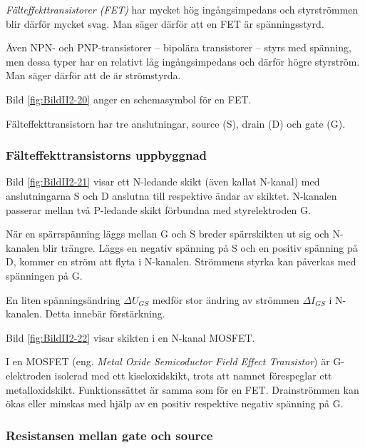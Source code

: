 \emph{Fälteffekttransistorer (FET)} har mycket hög ingångsimpedans och
styrströmmen blir därför mycket svag.
Man säger därför att en FET är spänningsstyrd.

Även NPN- och PNP-transistorer -- bipolära transistorer -- styrs med spänning,
men dessa typer har en relativt låg ingångsimpedans och därför högre styrström.
Man säger därför att de är strömstyrda.


Bild \ref{fig:BildII2-20} anger en schemasymbol för en FET.

Fälteffekttransistorn har tre anslutningar, source (S), drain (D) och gate (G).


\subsubsection{Fälteffekttransistorns uppbyggnad}

Bild \ref{fig:BildII2-21} visar ett N-ledande skikt (även kallat N-kanal) med
anslutningarna S och D anslutna till respektive ändar av skiktet.
N-kanalen passerar mellan två P-ledande skikt förbundna med styrelektroden G.

När en spärrspänning läggs mellan G och S breder spärrskikten ut sig och N-kanalen blir trängre.
Läggs en negativ spänning på S och en positiv spänning på D, kommer en ström att flyta i N-kanalen.
Strömmens styrka kan påverkas med spänningen på G.

En liten spänningsändring \(\Delta U_{GS}\) medför stor ändring av strömmen
\(\Delta I_{GS}\) i N-kanalen. Detta innebär förstärkning.



Bild \ref{fig:BildII2-22} visar skikten i en N-kanal MOSFET.

I en MOSFET (eng. \emph{Metal Oxide Semicoductor Field Effect Transistor}) är
G-elektroden isolerad med ett kiseloxidskikt, trots att namnet förespeglar ett
metalloxidskikt.
Funktionssättet är samma som för en FET.
Drainströmmen kan ökas eller minskas med hjälp av en positiv respektive negativ spänning på G.

\subsubsection{Resistansen mellan gate och source}

